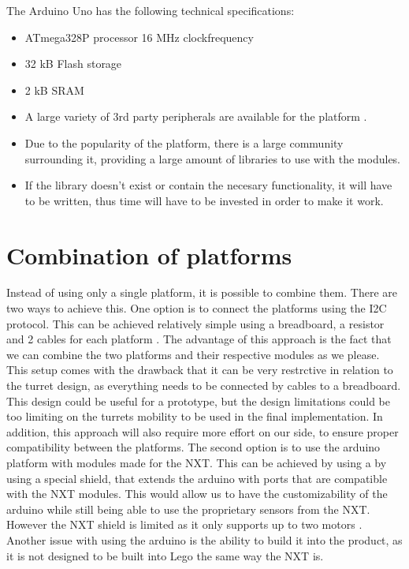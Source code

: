 The Arduino Uno has the following technical specifications\citep{UNOSpecs}:

\begin{itemize}
  \item ATmega328P processor 16 MHz clockfrequency
  \item 32 kB Flash storage
  \item 2 kB SRAM
  \item A large variety of 3rd party peripherals are available for the platform
  \citep{ArduinoComponents}.
  \item Due to the popularity of the platform, there is a large community
  surrounding it, providing a large amount of libraries to use with the
  modules.
  \item If the library doesn't exist or contain the necesary functionality, it
  will have to be written, thus time will have to be invested in order to make
  it work.
\end{itemize}

\section{Combination of platforms}\label{CombPlat}
Instead of using only a single platform, it is possible to combine them. There
are two ways to achieve this. One option is to connect the platforms using the
I2C protocol. This can be achieved relatively simple using a breadboard, a
resistor and 2 cables for each platform \citep{ArduinoNXT}. The advantage of
this approach is the fact that we can combine the two platforms and their
respective modules as we please. This setup comes with the drawback that it can
be very restrctive in relation to the turret design, as everything needs to be
connected by cables to a breadboard. This design could be useful for a
prototype, but the design limitations could be too limiting on the turrets
mobility to be used in the final implementation. In addition, this approach will
also require more effort on our side, to ensure proper compatibility between the
platforms. The second option is to use the arduino platform with modules made
for the NXT. This can be achieved by using a by using a special shield, that
extends the arduino with ports that are compatible with the NXT modules. This
would allow us to have the customizability of the arduino while still being able
to use the proprietary sensors from the NXT. However the NXT shield is limited
as it only supports up to two motors \citep{NXTShield}. Another issue with using
the arduino is the ability to build it into the product, as it is not designed
to be built into Lego the same way the NXT is.\nl

